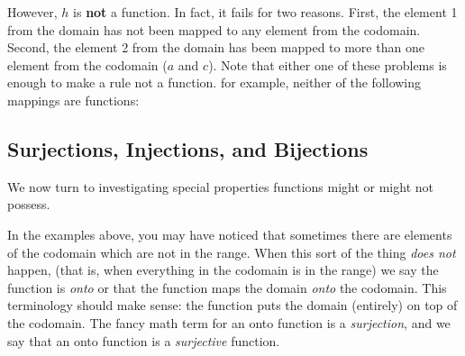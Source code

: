 \documentclass[12pt]{article}
\begin{document}
\begin{example}
\begin{solution}
  However, $h$ is \textbf{not} a function.  In fact, it fails for two reasons.  First, the element 1 from the domain has not been mapped to any element from the codomain.  Second, the element 2 from the domain has been mapped to more than one element from the codomain ($a$ and $c$).  Note that either one of these problems is enough to make a rule not a function.  for example, neither of the following mappings are functions:
  \begin{center}
    \begin{multicols}{2}


    \end{multicols}
  \end{center}

\end{solution}

\end{example}

\subsection{Surjections, Injections, and Bijections}

We now turn to investigating special properties functions might or might not possess.

In the examples above, you may have noticed that sometimes there are elements of the codomain which are not in the range.  When this sort of the thing \emph{does not} happen, (that is, when everything in the codomain is in the range) we say the function is \emph{onto} or that the function maps the domain \emph{onto} the codomain.  This terminology should make sense: the function puts the domain (entirely) on top of the codomain.  The fancy math term for an onto function is a \emph{surjection}, and we say that an onto function is a \emph{surjective} function.
\end{document}

